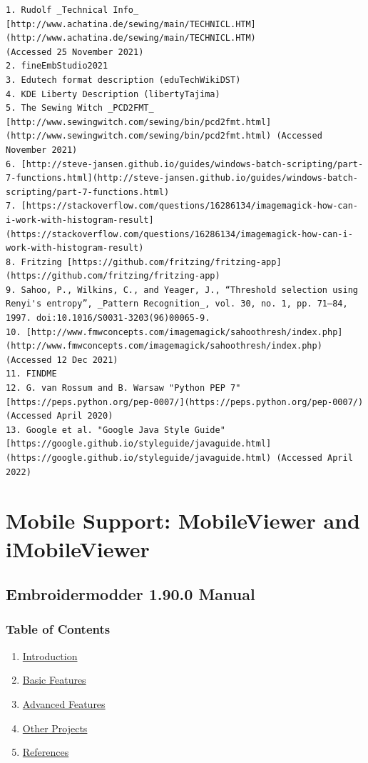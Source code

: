 \documentclass[a4paper, 11pt]{report}
\begin{document}
\begin{verbatim}
1. Rudolf _Technical Info_ [http://www.achatina.de/sewing/main/TECHNICL.HTM](http://www.achatina.de/sewing/main/TECHNICL.HTM)
(Accessed 25 November 2021)
2. fineEmbStudio2021
3. Edutech format description (eduTechWikiDST)
4. KDE Liberty Description (libertyTajima)
5. The Sewing Witch _PCD2FMT_ [http://www.sewingwitch.com/sewing/bin/pcd2fmt.html](http://www.sewingwitch.com/sewing/bin/pcd2fmt.html) (Accessed November 2021)
6. [http://steve-jansen.github.io/guides/windows-batch-scripting/part-7-functions.html](http://steve-jansen.github.io/guides/windows-batch-scripting/part-7-functions.html)
7. [https://stackoverflow.com/questions/16286134/imagemagick-how-can-i-work-with-histogram-result](https://stackoverflow.com/questions/16286134/imagemagick-how-can-i-work-with-histogram-result)
8. Fritzing [https://github.com/fritzing/fritzing-app](https://github.com/fritzing/fritzing-app)
9. Sahoo, P., Wilkins, C., and Yeager, J., “Threshold selection using Renyi's entropy”, _Pattern Recognition_, vol. 30, no. 1, pp. 71–84, 1997. doi:10.1016/S0031-3203(96)00065-9.
10. [http://www.fmwconcepts.com/imagemagick/sahoothresh/index.php](http://www.fmwconcepts.com/imagemagick/sahoothresh/index.php) (Accessed 12 Dec 2021)
11. FINDME
12. G. van Rossum and B. Warsaw "Python PEP 7" [https://peps.python.org/pep-0007/](https://peps.python.org/pep-0007/) (Accessed April 2020)
13. Google et al. "Google Java Style Guide" [https://google.github.io/styleguide/javaguide.html](https://google.github.io/styleguide/javaguide.html) (Accessed April 2022)
\end{verbatim}

\chapter{Mobile Support: MobileViewer and iMobileViewer}

\hypertarget{embroidermodder-1.90.0-manual}{%
\section{Embroidermodder 1.90.0
Manual}\label{embroidermodder-1.90.0-manual}}

\hypertarget{table-of-contents}{%
\subsection{Table of Contents}\label{table-of-contents}}

\begin{enumerate}
\def\labelenumi{\arabic{enumi}.}
\item \protect\hyperlink{introduction}{Introduction}
\item \protect\hyperlink{basic-features}{Basic Features}
\item \protect\hyperlink{advanced-features}{Advanced Features}
\item \protect\hyperlink{other-projects}{Other Projects}
\item \protect\hyperlink{References}{References}
\end{enumerate}
\end{document}
